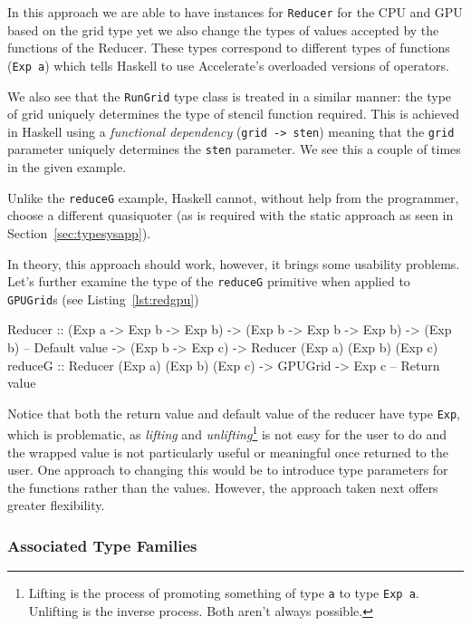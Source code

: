 \documentclass[
    12pt,
    a4paper,
    twoside,
    openright,
    ]{scrbook}
\begin{document}
In this approach we are able to have instances for \texttt{Reducer} for the CPU
and GPU based on the grid type yet we also change the types of values accepted
by the functions of the Reducer. These types correspond to different types of
functions (\texttt{Exp a}) which tells Haskell to use Accelerate's overloaded
versions of operators.

We also see that the \texttt{RunGrid} type class is treated in a similar manner:
the type of grid uniquely determines the type of stencil function required. This
is achieved in Haskell using a \emph{functional dependency} (\texttt{grid ->
  sten}) meaning that the \texttt{grid} parameter uniquely determines the
\texttt{sten} parameter\cite{jones2000}. We see this a couple of times in the
given example.

Unlike the \texttt{reduceG} example, Haskell cannot, without help from the
programmer, choose a different quasiquoter (as is required with the static
approach as seen in Section~\ref{sec:typesysapp}).

In theory, this approach should work, however, it brings some usability
problems. Let's further examine the type of the \texttt{reduceG} primitive
when applied to \texttt{GPUGrid}s (see Listing~\ref{lst:redgpu})

\begin{hlisting}[label={lst:redgpu}, caption={The type of the reducer once the
    Accelerate types are applied.}]
Reducer :: (Exp a -> Exp b -> Exp b)
        -> (Exp b -> Exp b -> Exp b)
        -> (Exp b) -- Default value
        -> (Exp b -> Exp c)
        -> Reducer (Exp a) (Exp b) (Exp c)
reduceG :: Reducer (Exp a) (Exp b) (Exp c)
        -> GPUGrid
        -> Exp c -- Return value
\end{hlisting}

Notice that both the return value and default value of the reducer have type
\texttt{Exp}, which is problematic, as \emph{lifting} and
\emph{unlifting}\footnote{Lifting is the process of promoting something of type
  \texttt{a} to type \texttt{Exp a}. Unlifting is the inverse process. Both
  aren't always possible.}  is not easy for the user to do and the wrapped value
is not particularly useful or meaningful once returned to the user. One approach
to changing this would be to introduce type parameters for the functions rather
than the values. However, the approach taken next offers greater flexibility.

\subsubsection{Associated Type Families}
\label{sec:assoctypefam}
\end{document}
